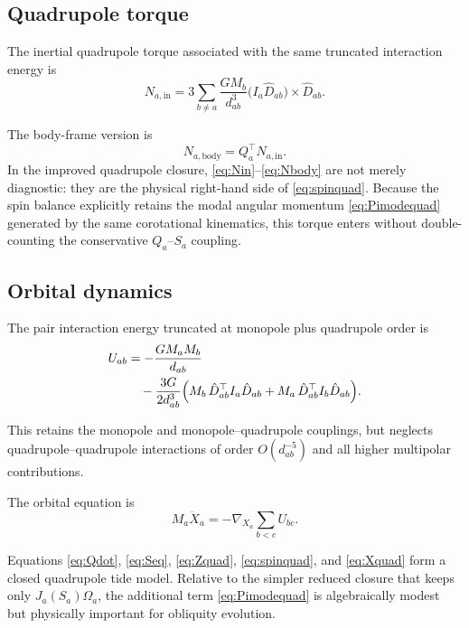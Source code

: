 \documentclass[journal, a4paper]{IEEEtran}
\begin{document}
\subsection{Quadrupole torque}

The inertial quadrupole torque associated with the same truncated interaction
energy is
\begin{equation}
N_{a,\mathrm{in}}
=
3\sum_{b\neq a}
\frac{G M_b}{d_{ab}^3}
\bigl(I_a\hat D_{ab}\bigr)\times \hat D_{ab}.
\label{eq:Nin}
\end{equation}

The body-frame version is
\begin{equation}
N_{a,\mathrm{body}}
=
Q_a^\top N_{a,\mathrm{in}}.
\label{eq:Nbody}
\end{equation}
In the improved quadrupole closure, \eqref{eq:Nin}--\eqref{eq:Nbody} are not
merely diagnostic: they are the physical right-hand side of
\eqref{eq:spinquad}. Because the spin balance explicitly retains the modal
angular momentum \eqref{eq:Pimodequad} generated by the same corotational
kinematics, this torque enters without double-counting the conservative
$Q_a$--$S_a$ coupling.

\subsection{Orbital dynamics}

The pair interaction energy truncated at monopole plus quadrupole order is
\begin{align}
U_{ab}
&=
-\frac{G M_a M_b}{d_{ab}}
\nonumber\\
&\quad
-\frac{3G}{2d_{ab}^3}
\Bigl(
M_b\,\hat D_{ab}^\top I_a \hat D_{ab}
+
M_a\,\hat D_{ab}^\top I_b \hat D_{ab}
\Bigr).
\label{eq:Uab}
\end{align}

This retains the monopole and monopole--quadrupole couplings, but neglects
quadrupole--quadrupole interactions of order $O(d_{ab}^{-5})$ and all higher
multipolar contributions.

The orbital equation is
\begin{equation}
M_a \ddot X_a
=
-\nabla_{X_a}\sum_{b<c} U_{bc}.
\label{eq:Xquad}
\end{equation}

Equations
\eqref{eq:Qdot},
\eqref{eq:Seq},
\eqref{eq:Zquad},
\eqref{eq:spinquad}, and
\eqref{eq:Xquad}
form a closed quadrupole tide model. Relative to the simpler reduced closure
that keeps only $J_a(S_a)\Omega_a$, the additional term \eqref{eq:Pimodequad}
is algebraically modest but physically important for obliquity evolution.
\end{document}
